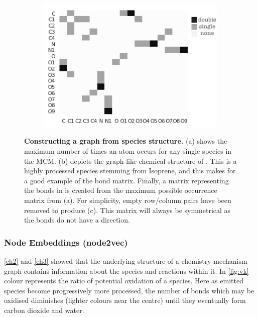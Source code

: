 \begin{figure}[H]
\begin{subfigure}[b]{0.325\textwidth}
         \includegraphics[width=\textwidth,height=.8\textwidth]{4fig/INB1NBCO3_adj.png}
          \caption{}
         \label{fig:adjmol}
     \end{subfigure}

        \caption{ \textbf{Constructing a graph from species structure.} 
        (a) shows the maximum number of times an atom occurs for any single species in the MCM. (b) depicts the graph-like chemical structure of . This is a highly processed species stemming from Isoprene, and this makes for a good example of the bond matrix. Finally, a matrix representing the bonds in  is created from the maximum possible occurrence matrix from (a). For simplicity, empty row/column pairs have been removed to produce (c). This matrix will always be symmetrical as the bonds do not have a direction.}
        \label{fig:bondmat}
\end{figure}


\subsubsection{Node Embeddings (node2vec)}\label{sec:n2vec}
\autoref{ch2} and \autoref{ch3} showed that the underlying structure of a chemistry mechanism graph contains information about the species and reactions within it. In \autoref{fig:vk} colour represents the ratio of potential oxidation of a species. Here as emitted species become progressively more processed, the number of bonds which may be oxidised diminishes (lighter colours near the centre) until they eventually form carbon dioxide and water. 


